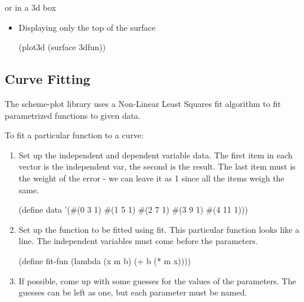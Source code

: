 \documentclass{article}
\begin{document}
{\begin{itemize}
\begin{itemize}
\end{itemize}
or in a 3d box\begin{itemize}
\item Displaying only the top of the surface
\begin{schemedisplay}
(plot3d (surface 3dfun))
\end{schemedisplay}

\end{itemize}



\end{itemize}

\label{Curve Fitting}
\subsection{Curve Fitting}



The scheme-plot library uses a Non-Linear Least Squares fit algorithm 
       to fit parametrized functions to given data.


To fit a particular function to a curve:
\begin{enumerate}
\item Set up the independent and dependent variable data. The first item in each vector is the 
independent var, the second is the result. The last item must is the weight of the error - we can leave 
it as 1 since all the items weigh the same.
\begin{schemedisplay}

(define data '(#(0 3 1)
               #(1 5 1)
               #(2 7 1)
               #(3 9 1)
               #(4 11 1)))

\end{schemedisplay}

\item Set up the function to be fitted using fit. This particular function
         looks like a line. The independent variables must come before the parameters.
\begin{schemedisplay}

(define fit-fun 
 (lambda (x m b) (+ b (* m x))))
\end{schemedisplay}

\item If possible, come up with some guesses for the values of the parameters.
        The guesses can be left as one, but each parameter must be named.



\end{enumerate}}
\end{document}
